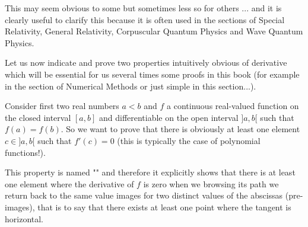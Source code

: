 This may seem obvious to some but sometimes less so for others ... and it is clearly useful to clarify this because it is often used in the sections of Special Relativity, General Relativity, Corpuscular Quantum Physics and Wave Quantum Physics.

Let us now indicate and prove two properties intuitively obvious of derivative which will be essential for us several times some proofs in this book (for example in the section of Numerical Methods or just simple in this section...).

\begin{theorem}
Consider first two real numbers $a<b$ and $f$ a continuous real-valued function on the closed interval $[a, b]$ and differentiable on the open interval $]a, b[$ such that $f(a)=f(b)$. So we want to prove that there is obviously  at least one element $c \in ]a, b[$ such that $f'(c)=0$ (this is typically the case of polynomial functions!).

This property is named "\label{rolle theorem}" and therefore it explicitly shows that there is at least one element where the derivative of $f$ is zero when we browsing its path we return back to the same value images for two distinct values of the abscissas (pre-images), that is to say that there exists at least one point where the tangent is horizontal.
\end{theorem}


